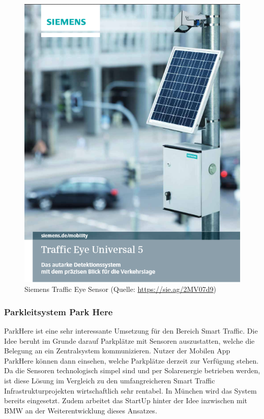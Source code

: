 \begin{figure}[ht]
\begin{center}
\includegraphics[scale=0.3]{images/SiemensTrafficEyeSensor.png}
	\caption{Siemens Traffic Eye Sensor (Quelle: \url{https://sie.ag/2MV07d9})}
	\label{fig14}
\end{center}

\end{figure}

\subsubsection{Parkleitsystem Park Here}
ParkHere ist eine sehr interessante Umsetzung für den Bereich Smart Traffic. Die Idee beruht im Grunde darauf Parkplätze mit Sensoren auszustatten, welche die Belegung an ein Zentralsystem kommunizieren. Nutzer der Mobilen App ParkHere können dann einsehen, welche Parkplätze derzeit zur Verfügung stehen. Da die Sensoren technologisch simpel sind und per Solarenergie betrieben werden, ist diese Lösung im Vergleich zu den umfangreicheren Smart Traffic Infrastrukturprojekten wirtschaftlich sehr rentabel. In München wird das System bereits eingesetzt. Zudem arbeitet das StartUp hinter der Idee inzwischen mit BMW an der Weiterentwicklung dieses Ansatzes.

